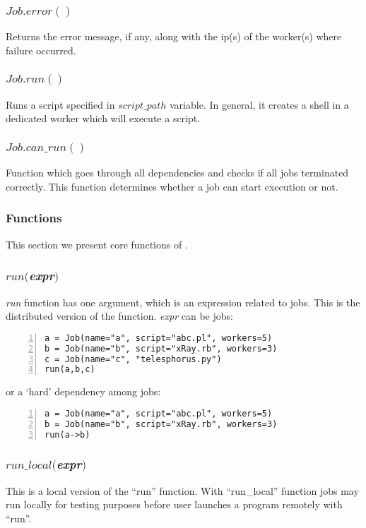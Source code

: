 \subsubsection*{$Job.error()$}
Returns the error message, if any, along with the ip(s) of the worker(s) where failure occurred.
\subsubsection*{$Job.run()$}
Runs a script specified in $script\_path$ variable. In general, it creates a shell in a dedicated worker which will execute a script.
\subsubsection*{$Job.can\_run()$}
Function which goes through all dependencies and checks if all jobs terminated correctly. This function determines whether
a job can start execution or not.

\subsubsection*{\lang{} Functions}

This section we present core functions of \lang{}.
\subsubsection*{$run($\textit{expr}$)$}
\textit{run} function has one argument, which is an expression related to jobs.
This is the distributed version of the function.
\textit{expr} can be jobs:
\begin{Verbatim}[numbers=left]
a = Job(name="a", script="abc.pl", workers=5)
b = Job(name="b", script="xRay.rb", workers=3)
c = Job(name="c", "telesphorus.py")
run(a,b,c)
\end{Verbatim}
or a `hard' dependency among jobs:
\begin{Verbatim}[numbers=left]
a = Job(name="a", script="abc.pl", workers=5)
b = Job(name="b", script="xRay.rb", workers=3)
run(a->b)
\end{Verbatim}
\subsubsection*{$run\_local($\textit{expr}$)$}
This is a local version of the ``run'' function. With ``run\_local'' function jobs may run locally for testing purposes before user launches a program remotely with ``run''.

